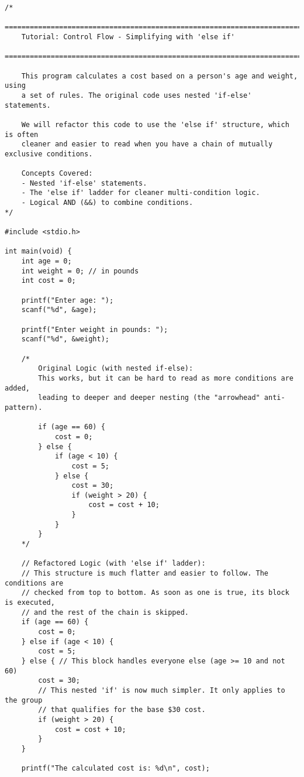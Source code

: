\documentclass[11pt]{book}
\begin{document}
\begin{verbatim}
/*
    ================================================================================
    Tutorial: Control Flow - Simplifying with 'else if'
    ================================================================================

    This program calculates a cost based on a person's age and weight, using
    a set of rules. The original code uses nested 'if-else' statements.

    We will refactor this code to use the 'else if' structure, which is often
    cleaner and easier to read when you have a chain of mutually exclusive conditions.

    Concepts Covered:
    - Nested 'if-else' statements.
    - The 'else if' ladder for cleaner multi-condition logic.
    - Logical AND (&&) to combine conditions.
*/

#include <stdio.h>

int main(void) {
    int age = 0;
    int weight = 0; // in pounds
    int cost = 0;

    printf("Enter age: ");
    scanf("%d", &age);

    printf("Enter weight in pounds: ");
    scanf("%d", &weight);

    /*
        Original Logic (with nested if-else):
        This works, but it can be hard to read as more conditions are added,
        leading to deeper and deeper nesting (the "arrowhead" anti-pattern).

        if (age == 60) {
            cost = 0;
        } else {
            if (age < 10) {
                cost = 5;
            } else {
                cost = 30;
                if (weight > 20) {
                    cost = cost + 10;
                }
            }
        }
    */

    // Refactored Logic (with 'else if' ladder):
    // This structure is much flatter and easier to follow. The conditions are
    // checked from top to bottom. As soon as one is true, its block is executed,
    // and the rest of the chain is skipped.
    if (age == 60) {
        cost = 0;
    } else if (age < 10) {
        cost = 5;
    } else { // This block handles everyone else (age >= 10 and not 60)
        cost = 30;
        // This nested 'if' is now much simpler. It only applies to the group
        // that qualifies for the base $30 cost.
        if (weight > 20) {
            cost = cost + 10;
        }
    }

    printf("The calculated cost is: %d\n", cost);


\end{verbatim}
\end{document}
